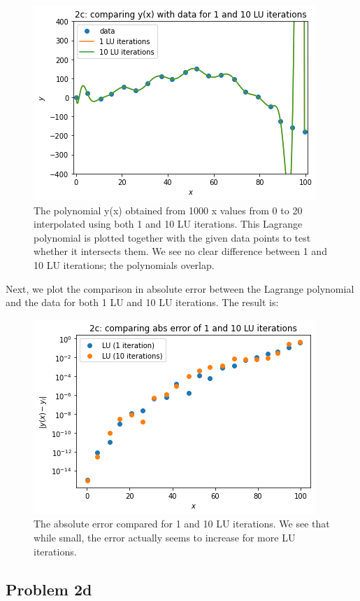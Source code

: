 \begin{figure}[h!]
  \centering
  \includegraphics[width=0.5\linewidth]{problem2c1.png}
  \caption{The polynomial y(x) obtained from 1000 x values from 0 to 20 interpolated using both 1 and 10 LU iterations. This Lagrange polynomial is plotted together with the given data points to test whether it intersects them. We see no clear difference between 1 and 10 LU iterations; the polynomials overlap.}
  \label{fig:fig5}
\end{figure}

Next, we plot the comparison in absolute error between the Lagrange polynomial and the data for both 1 LU and 10 LU iterations. The result is:\\

\begin{figure}[h!]
  \centering
  \includegraphics[width=0.5\linewidth]{problem2c2.png}
  \caption{The absolute error compared for 1 and 10 LU iterations. We see that while small, the error actually seems to increase for more LU iterations.}
  \label{fig:fig6}
\end{figure}

\subsection{Problem 2d}

